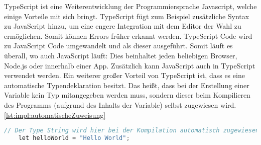 TypeScript ist eine Weiterentwicklung der Programmiersprache Javascript, welche
einige Vorteile mit sich bringt. TypeScript fügt zum Beispiel zusätzliche Syntax zu
JavaScript hinzu, um eine engere Integration mit dem Editor der Wahl zu ermöglichen.
Somit können Errors früher erkannt werden. TypeScript Code wird zu JavaScript Code
umgewandelt und als dieser ausgeführt. Somit läuft es überall, wo auch JavaScript läuft:
Dies beinhaltet jeden beliebigen Browser, Node.js oder innerhalb einer App. Zusätzlich
kann JavaScript auch in TypeScript verwendet werden. Ein weiterer großer Vorteil von
TypeScript ist, dass es eine automatische Typendeklaration besitzt. Das heißt, dass bei
der Erstellung einer Variable kein Typ mitangegeben werden muss, sondern dieser beim
Kompilieren des Programms (aufgrund des Inhalts der Variable) selbst zugewiesen wird. \ref{lst:impl:automatischeZuweisung}
\cite{JavaScriptJavaEntwickler} 
\cite{TypeScriptOverview} 

\begin{lstlisting}[language=java,caption=TypeScript automatische Zuweisung,label=lst:impl:automatischeZuweisung]
    // Der Type String wird hier bei der Kompilation automatisch zugewiesen
    let helloWorld = "Hello World";
\end{lstlisting}